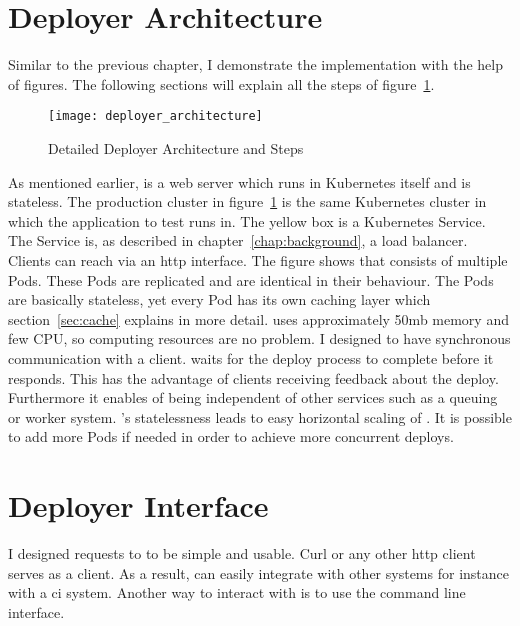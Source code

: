 \section{Deployer Architecture}

Similar to the previous chapter, I demonstrate the implementation with the help of
figures. The following sections will explain all the steps of
figure~\ref{fig:deployer_architecture}.

\begin{figure}[htbp]
  \centering
  \texttt{[image: deployer\_architecture]}
  \caption{Detailed Deployer Architecture and Steps}
  \label{fig:deployer_architecture}
\end{figure}

As mentioned earlier, \deployer is a web server which runs in Kubernetes itself and is
stateless. The production cluster in figure~\ref{fig:deployer_architecture} is the same
Kubernetes cluster in which the application to test runs in. The yellow box is a
Kubernetes Service. The Service is, as described in chapter~\ref{chap:background}, a
load balancer. Clients can reach \deployer via an http interface. The figure shows that
\deployer consists of multiple Pods. These Pods are replicated and are identical in their
behaviour. The Pods are basically stateless, yet every Pod has its own caching layer which
section~\ref{sec:cache} explains in more detail. \deployer uses approximately 50mb memory
and few CPU, so computing resources are no problem. I designed \deployer to have
synchronous communication with a client. \deployer waits for the deploy process to complete
before it responds. This has the advantage of clients receiving feedback about the
deploy. Furthermore it enables \deployer of being independent of other services such as a
queuing or worker system. \deployer's statelessness leads to easy horizontal scaling of
\deployer. It is possible to add more Pods if needed in order to achieve more concurrent
deploys.

\section{Deployer Interface}
\label{sec:interface}

I designed requests to \deployer to be simple and usable. Curl or any other http client
serves as a client. As a result, \deployer can easily integrate with other systems for
instance with a \gls{ci} system. Another way to interact with \deployer is to use the
\depctl command line interface.

